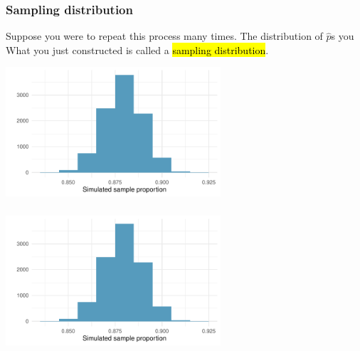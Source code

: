 
\begin{frame}
\frametitle{Sampling distribution}

Suppose you were to repeat this process many times. The distribution of $\hat{p}$s 
you What you just constructed is called a \hl{sampling distribution}.

\begin{center}
\includegraphics[width=0.6\textwidth]{5-1_point_est_sampling_var/figures/solar-power/solar-power-sampling.pdf}
\end{center}

\end{frame}


\begin{frame}
\frametitle{}


\begin{center}
\includegraphics[width=0.6\textwidth]{5-1_point_est_sampling_var/figures/solar-power/solar-power-sampling.pdf}
\end{center}

$\:$ \\

\end{frame}

